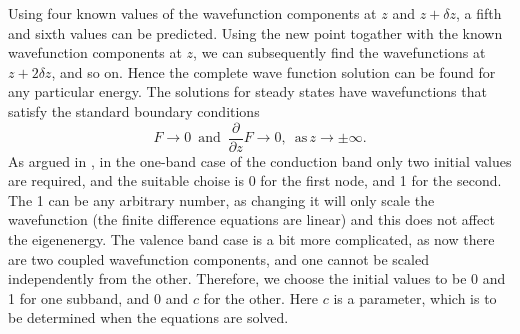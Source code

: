 Using four known values of the wavefunction components at $z$ and
$z+\delta z$, a fifth and sixth values can be predicted. Using the
new point togather with the known wavefunction components at $z$,
we can subsequently find the wavefunctions at $z+2\delta z$, and
so on. Hence the complete wave function solution can be found for
any particular energy. The solutions for steady states have wavefunctions
that satisfy the standard boundary conditions \begin{equation}
F\rightarrow0\,\,\,\textrm{and}\,\,\,\frac{\partial}{\partial z}F\rightarrow0,\,\,\,\textrm{as}\, z\rightarrow\pm\infty.\label{eq:Shooting_Method_Boundary_Conditions}\end{equation}
As argued in \citet{harrison_quantum_2000}, in the one-band case
of the conduction band only two initial values are required, and the
suitable choise is 0 for the first node, and 1 for the second. The
1 can be any arbitrary number, as changing it will only scale the
wavefunction (the finite difference equations are linear) and this
does not affect the eigenenergy. The valence band case is a bit more
complicated, as now there are two coupled wavefunction components,
and one cannot be scaled independently from the other. Therefore,
we choose the initial values to be 0 and 1 for one subband, and 0
and $c$ for the other. Here $c$ is a parameter, which is to be determined
when the equations are solved. 

